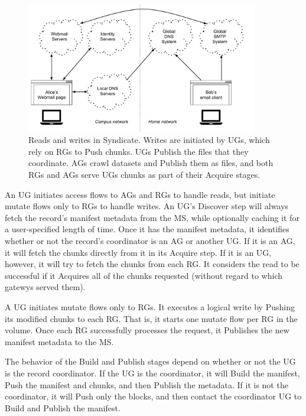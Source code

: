 \begin{figure}[h]
   \centering
   \includegraphics[width=0.9\textwidth,page=21]{figures/dissertation-figures}
   \caption{Reads and writes in Syndicate.  Writes are initiated by UGs, which
   rely on RGs to Push chunks.  UGs Publish the files that they coordinate.  AGs
   crawl datasets and Publish them as files, and both RGs and AGs serve UGs
   chunks as part of their Acquire stages.}
   \label{fig:chap3-syndicate-reads-writes}
\end{figure}

An UG initiates access flows to AGs and RGs to handle reads, but initiate mutate
flows only to RGs to handle writes.  An UG's Discover step will always fetch the
record's manifest metadata from the MS, while optionally caching it for a
user-specified length of time.  Once it has the manifest metadata, it identifies
whether or not the record's coordinator is an AG or another UG.   If it is an
AG, it will fetch the chunks directly from it in its Acquire step.  If it is an
UG, however, it will try to fetch the chunks from each RG.  It considers the
read to be successful if it Acquires all of the chunks requested (without regard
to which gatewys served them).

A UG initiates mutate flows only to RGs.  It executes a logical write by Pushing
its modified chunks to each RG.  That is, it starts one mutate flow per RG in
the volume.  Once each RG successfully processes the request, it Publishes the
new manifest metadata to the MS.

The behavior of the Build and Publish stages depend on whether or not the UG is
the record coordinator.  If the UG is the coordinator, it will Build the
manifest, Push the manifest and chunks, and then Publish the metadata.  If it is
not the coordinator, it will Push only the blocks, and then
contact the coordinator UG to Build and Publish the manifest.

